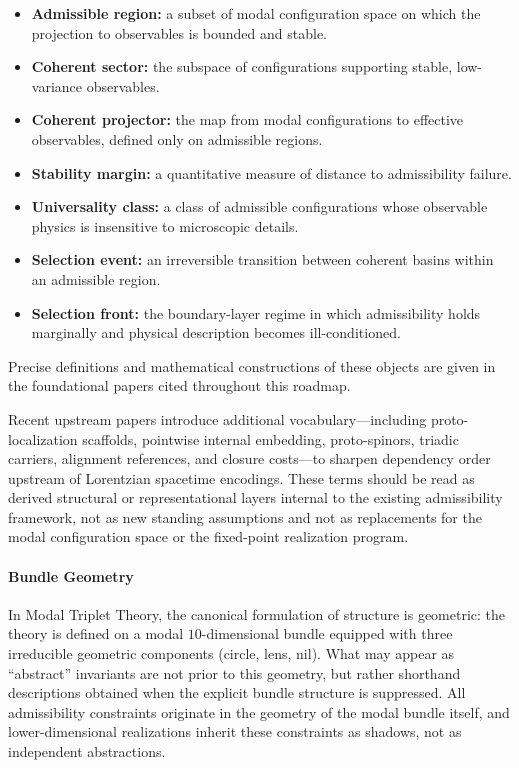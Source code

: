\documentclass[11pt]{article}
\begin{document}
\begin{itemize}
\item \textbf{Admissible region:} a subset of modal configuration space on which the projection to observables is bounded and stable.
\item \textbf{Coherent sector:} the subspace of configurations supporting stable, low-variance observables.
\item \textbf{Coherent projector:} the map from modal configurations to effective observables, defined only on admissible regions.
\item \textbf{Stability margin:} a quantitative measure of distance to admissibility failure.
\item \textbf{Universality class:} a class of admissible configurations whose observable physics is insensitive to microscopic details.
\item \textbf{Selection event:} an irreversible transition between coherent basins within an admissible region.
\item \textbf{Selection front:} the boundary-layer regime in which admissibility holds marginally and physical description becomes ill-conditioned.
\end{itemize}

Precise definitions and mathematical constructions of these objects are given in the foundational papers cited throughout this roadmap.

Recent upstream papers introduce additional vocabulary---including proto-localization scaffolds,
pointwise internal embedding, proto-spinors, triadic carriers, alignment references, and closure
costs---to sharpen dependency order upstream of Lorentzian spacetime encodings. These terms
should be read as derived structural or representational layers internal to the existing admissibility
framework, not as new standing assumptions and not as replacements for the modal configuration
space or the fixed-point realization program.

\paragraph{Bundle Geometry}
In Modal Triplet Theory, the canonical formulation of structure is geometric:
the theory is defined on a modal $10$-dimensional bundle equipped with
three irreducible geometric components (circle, lens, nil).
What may appear as ``abstract'' invariants are not prior to this geometry,
but rather shorthand descriptions obtained when the explicit bundle structure
is suppressed.
All admissibility constraints originate in the geometry of the modal bundle
itself, and lower-dimensional realizations inherit these constraints as shadows,
not as independent abstractions.
\end{document}
